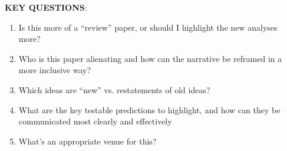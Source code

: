 \textbf{KEY QUESTIONS}:
\begin{enumerate}
  \item Is this more of a ``review'' paper, or should I highlight the new analyses more?
  \item Who is this paper alienating and how can the narrative be reframed in a more inclusive way?
  \item Which ideas are ``new'' vs. restatements of old ideas?
  \item What are the key testable predictions to highlight, and how can they be communicated most clearly and effectively
  \item What's an appropriate venue for this?
\end{enumerate}







